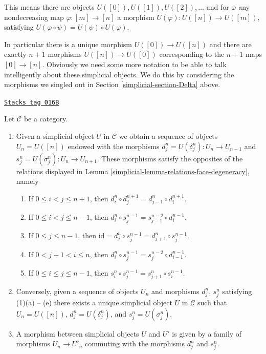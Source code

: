 This means there are objects $U([0]), U([1]), U([2]), \ldots$
and for $\varphi$ any nondecreasing map $\varphi : [m] \to [n]$
a morphism $U(\varphi) : U([n]) \to U([m])$, satisfying
$U(\varphi \circ \psi) = U(\psi) \circ U(\varphi)$.

\medskip\noindent
In particular there is a unique morphism $U([0]) \to U([n])$ and there are
exactly $n + 1$ morphisms $U([n]) \to U([0])$ corresponding to
the $n + 1$ maps $[0] \to [n]$. Obviously we need some more notation
to be able to talk
intelligently about these simplicial objects. We do this by considering
the morphisms we singled out in Section \ref{simplicial-section-Delta} above.

\begin{lemma}
\label{simplicial-lemma-characterize-simplicial-object}
\href{https://stacks.math.columbia.edu/tag/016B}{\texttt{Stacks tag 016B}}

Let $\mathcal{C}$ be a category.
\begin{enumerate}
\item Given a simplicial object $U$ in $\mathcal{C}$
we obtain a sequence of objects $U_n = U([n])$ endowed
with the morphisms $d^n_j = U(\delta^n_j) : U_n \to U_{n-1}$ and
$s^n_j = U(\sigma^n_j) : U_n \to U_{n + 1}$. These morphisms
satisfy the opposites of the relations displayed in
Lemma \ref{simplicial-lemma-relations-face-degeneracy}, namely
\begin{enumerate}
\item If $0 \leq i < j \leq n + 1$, then
$d^n_i \circ d^{n + 1}_j = d^n_{j - 1} \circ d^{n + 1}_i$.
\item If $0 \leq i < j \leq n - 1$, then
$d^n_i \circ s^{n - 1}_j = s^{n - 2}_{j - 1} \circ d^{n - 1}_i$.
\item If $0 \leq j \leq n - 1$, then
$\text{id} = d^n_j \circ s^{n - 1}_j = d^n_{j + 1} \circ s^{n - 1}_j$.
\item If $0 < j + 1 < i \leq n$, then
$d^n_i \circ s^{n - 1}_j = s^{n - 2}_j \circ d^{n - 1}_{i - 1}$.
\item If $0 \leq i \leq j \leq n - 1$, then
$s^n_i \circ s^{n - 1}_j = s^n_{j + 1} \circ s^{n - 1}_i$.
\end{enumerate}
\item Conversely, given a sequence of objects $U_n$ and morphisms
$d^n_j$, $s^n_j$ satisfying (1)(a) -- (e) there exists a unique
simplicial object $U$ in $\mathcal{C}$ such that $U_n = U([n])$,
$d^n_j = U(\delta^n_j)$, and $s^n_j = U(\sigma^n_j)$.
\item A morphism between simplicial objects $U$ and $U'$
is given by a family of morphisms $U_n \to U'_n$ commuting
with the morphisms $d^n_j$ and $s^n_j$.
\end{enumerate}
\end{lemma}

